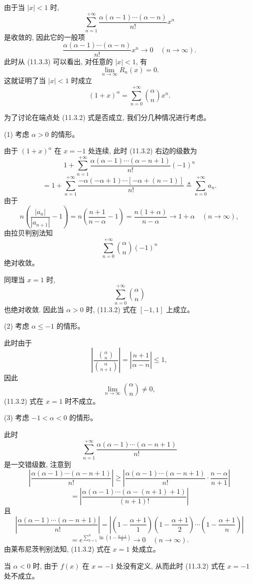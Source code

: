 \documentclass[UTF8, 12pt, fontset=fandol, oneside]{ctexart}
\begin{document}
由于当 $|x|<1$ 时,
\[
  \sum_{n=1}^{+\infty}
  \frac{\alpha(\alpha-1)\cdots(\alpha-n)}{n!}x^n
\]
是收敛的, 因此它的一般项
\[
  \frac{\alpha(\alpha-1)\cdots(\alpha-n)}{n!}x^n
  \to0\quad(n\to\infty).
\]
此时从 (11.3.3) 可以看出, 对任意的 $|x|<1$, 有
\[
  \lim_{n\to\infty}R_n(x)=0.
\]
这就证明了当 $|x|<1$ 时成立
\[
  (1+x)^\alpha=\sum_{n=0}^{+\infty}\binom{\alpha}{n}x^n.
\]

为了讨论在端点处 (11.3.2) 式是否成立, 我们分几种情况进行考虑。

(1) 考虑 $\alpha>0$ 的情形。

由于 $(1+x)^\alpha$ 在 $x=-1$ 处连续, 此时 (11.3.2) 右边的级数为
\[
  1+\sum_{n=1}^{+\infty}
  \frac{\alpha(\alpha-1)\cdots(\alpha-n+1)}{n!}(-1)^n
\]
\[
  =
  1+\sum_{n=1}^{+\infty}
  \frac{-\alpha(-\alpha+1)\cdots[-\alpha+(n-1)]}{n!}
  \triangleq
  \sum_{n=0}^{+\infty}a_n.
\]
由于
\[
  n\left(\frac{|a_n|}{|a_{n+1}|}-1\right)
  =
  n\left(\frac{n+1}{n-\alpha}-1\right)
  =
  \frac{n(1+\alpha)}{n-\alpha}
  \to1+\alpha\quad(n\to\infty),
\]
由拉贝判别法知
\[
  \sum_{n=0}^{+\infty}\binom{\alpha}{n}(-1)^n
\]
绝对收敛。

同理当 $x=1$ 时,
\[
  \sum_{n=0}^{+\infty}\binom{\alpha}{n}
\]
也绝对收敛. 因此当 $\alpha>0$ 时, (11.3.2) 式在 $[-1,1]$ 上成立。

(2) 考虑 $\alpha\leqslant-1$ 的情形。

此时由于
\[
  \left|
    \frac{\binom{\alpha}{n}}{\binom{\alpha}{n+1}}
  \right|
  =
  \left|\frac{n+1}{\alpha-n}\right|
  \leqslant1,
\]
因此
\[
  \lim_{n\to\infty}\binom{\alpha}{n}\ne0,
\]
(11.3.2) 式在 $x=1$ 时不成立。

(3) 考虑 $-1<\alpha<0$ 的情形。

此时
\[
  \sum_{n=1}^{+\infty}
  \frac{\alpha(\alpha-1)\cdots(\alpha-n+1)}{n!}
\]
是一交错级数, 注意到
\[
  \left|
    \frac{\alpha(\alpha-1)\cdots(\alpha-n+1)}{n!}
  \right|
  \geqslant
  \left|
    \frac{\alpha(\alpha-1)\cdots(\alpha-n+1)}{n!}
    \cdot\frac{n-\alpha}{n+1}
  \right|
\]
\[
  =
  \left|
    \frac{\alpha(\alpha-1)\cdots(\alpha-(n+1)+1)}{(n+1)!}
  \right|
\]
且
\[
  \left|
    \frac{\alpha(\alpha-1)\cdots(\alpha-n+1)}{n!}
  \right|
  =
  \left|
    \left(1-\frac{\alpha+1}{1}\right)
    \left(1-\frac{\alpha+1}{2}\right)
    \cdots
    \left(1-\frac{\alpha+1}{n}\right)
  \right|
\]
\[
  =
  e^{\sum_{k=1}^{n}\ln\left(1-\frac{\alpha+1}{k}\right)}
  \to0\quad(n\to\infty).
\]
由莱布尼茨判别法知, (11.3.2) 式在 $x=1$ 处成立。

当 $\alpha<0$ 时, 由于 $f(x)$ 在 $x=-1$ 处没有定义, 从而此时 (11.3.2) 式在 $x=-1$ 处不成立。
\end{document}
